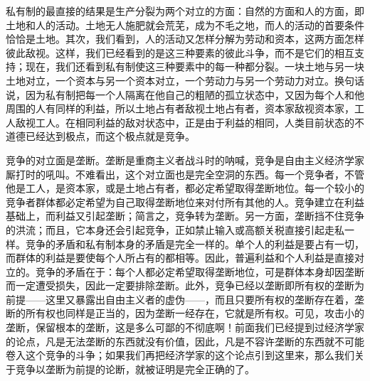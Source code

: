 \documentclass[a4paper,twoside,12pt,AutoFakeBold]{ctexart}
\begin{document}
私有制的最直接的结果是生产分裂为两个对立的方面：自然的方面和人的方面，即土地和人的活动。土地无人施肥就会荒芜，成为不毛之地，而人的活动的首要条件恰恰是土地。其次，我们看到，人的活动又怎样分解为劳动和资本，这两方面怎样彼此敌视。这样，我们已经看到的是这三种要素的彼此斗争，而不是它们的相互支持；现在，我们还看到私有制使这三种要素中的每一种都分裂。一块土地与另一块土地对立，一个资本与另一个资本对立，一个劳动力与另一个劳动力对立。换句话说，因为私有制把每一个人隔离在他自己的粗陋的孤立状态中，又因为每个人和他周围的人有同样的利益，所以土地占有者敌视土地占有者，资本家敌视资本家，工人敌视工人。在相同利益的敌对状态中，正是由于利益的相同，人类目前状态的不道德已经达到极点，而这个极点就是竞争。

竞争的对立面是垄断。垄断是重商主义者战斗时的呐喊，竞争是自由主义经济学家厮打时的吼叫。不难看出，这个对立面也是完全空洞的东西。每一个竞争者，不管他是工人，是资本家，或是土地占有者，都必定希望取得垄断地位。每一个较小的竞争者群体都必定希望为自己取得垄断地位来对付所有其他的人。竞争建立在利益基础上，而利益又引起垄断；简言之，竞争转为垄断。另一方面，垄断挡不住竞争的洪流；而且，它本身还会引起竞争，正如禁止输入或高额关税直接引起走私一样。竞争的矛盾和私有制本身的矛盾是完全一样的。单个人的利益是要占有一切，而群体的利益是要使每个人所占有的都相等。因此，普遍利益和个人利益是直接对立的。竞争的矛盾在于：每个人都必定希望取得垄断地位，可是群体本身却因垄断而一定遭受损失，因此一定要排除垄断。此外，竞争已经以垄断即所有权的垄断为前提——这里又暴露出自由主义者的虚伪——，而且只要所有权的垄断存在着，垄断的所有权也同样是正当的，因为垄断一经存在，它就是所有权。可见，攻击小的垄断，保留根本的垄断，这是多么可鄙的不彻底啊！前面我们已经提到过经济学家的论点，凡是无法垄断的东西就没有价值，因此，凡是不容许垄断的东西就不可能卷入这个竞争的斗争；如果我们再把经济学家的这个论点引到这里来，那么我们关于竞争以垄断为前提的论断，就被证明是完全正确的了。
\end{document}
